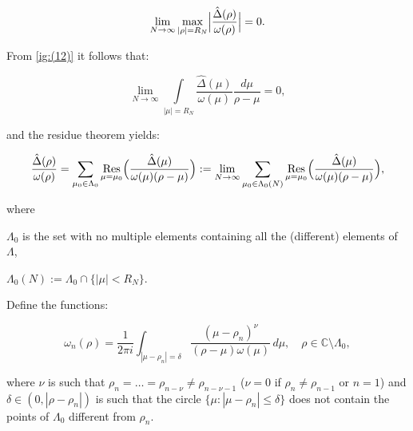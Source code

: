 \begin{equation}

\lim\limits_{N\to\infty}\max\limits_{|\rho|=R_N}\Bigl|\frac{\hat\Delta(\rho)}{\omega(\rho)}\Bigr|=0. 

\label{ig:(12)}

\end{equation}

From \eqref{ig:(12)} it follows that:

$$

\lim\limits_{N\to\infty}\int\limits_{|\mu|=R_N}\frac{\hat\Delta(\mu)}{\omega(\mu)}\frac{d\mu}{\rho-\mu}=0,

$$

and the residue theorem yields:

\begin{equation}

\frac{\hat\Delta(\rho)}{\omega(\rho)}=

\sum\limits_{\mu_0\in\Lambda_0} \mathop{\rm Res}_{\mu=\mu_0}

\Bigl(\frac{\hat\Delta(\mu)}{\omega(\mu)(\rho-\mu)}\Bigr):=

\lim\limits_{N\to\infty}\sum\limits_{\mu_0\in\Lambda_0(N)} \mathop{\rm Res}_{\mu=\mu_0}\Bigl(\frac{\hat\Delta(\mu)}{\omega(\mu)(\rho-\mu)}\Bigr), 

\label{ig:(13)}

\end{equation}

where

$\Lambda_0$ is the set with no multiple elements containing all the (different) elements of $\Lambda$,

$\Lambda_0(N):=\Lambda_0\cap\{|\mu|<R_N\}$.



Define the functions:

\begin{equation}

\omega_{n}(\rho)=\frac{1}{2\pi i}\int_{|\mu-\rho_n|=\delta}\frac{(\mu-\rho_n)^\nu}{(\rho-\mu)\omega(\mu)}\,d\mu, \quad  \rho\in\mathbb{C}\setminus\Lambda_0,

\label{ig:(14)}

\end{equation}

 where $\nu$ is such that $\rho_n=\dots=\rho_{n-\nu}\neq\rho_{n-\nu-1}$ ($\nu=0$ if $\rho_n\neq\rho_{n-1}$ or $n=1$) and $\delta\in(0,|\rho-\rho_n|)$ is such that the circle $\{\mu:|\mu-\rho_n|\leq\delta\}$ does not contain the points of $\Lambda_0$ different from $\rho_n$. 

